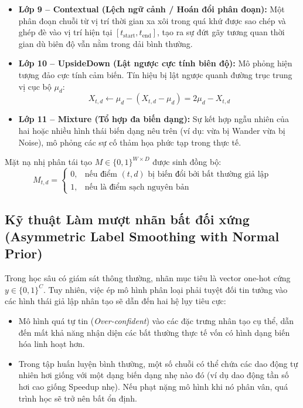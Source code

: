 \documentclass[11pt,journal,onecolumn]{IEEEtran}
\begin{document}
\begin{itemize}
    \item \textbf{Lớp 9 -- Contextual (Lệch ngữ cảnh / Hoán đổi phân đoạn):} Một phân đoạn chuỗi từ vị trí thời gian xa xôi trong quá khứ được sao chép và ghép đè vào vị trí hiện tại $[t_{\text{start}}, t_{\text{end}}]$, tạo ra sự đứt gãy tương quan thời gian dù biên độ vẫn nằm trong dải bình thường.
    
    \item \textbf{Lớp 10 -- UpsideDown (Lật ngược cực tính biên độ):} Mô phỏng hiện tượng đảo cực tính cảm biến. Tín hiệu bị lật ngược quanh đường trục trung vị cục bộ $\mu_d$:
    \begin{equation}
    X_{t, d} \leftarrow \mu_d - (X_{t, d} - \mu_d) = 2\mu_d - X_{t, d}
    \end{equation}
    
    \item \textbf{Lớp 11 -- Mixture (Tổ hợp đa biến dạng):} Sự kết hợp ngẫu nhiên của hai hoặc nhiều hình thái biến dạng nêu trên (ví dụ: vừa bị Wander vừa bị Noise), mô phỏng các sự cố thảm họa phức tạp trong thực tế.
\end{itemize}

Mặt nạ nhị phân tái tạo $M \in \{0, 1\}^{W \times D}$ được sinh đồng bộ:
\begin{equation}
\label{eq:binary_mask}
M_{t, d} = 
\begin{cases}
0, & \text{nếu điểm } (t, d) \text{ bị biến đổi bởi bất thường giả lập} \\
1, & \text{nếu là điểm sạch nguyên bản}
\end{cases}
\end{equation}

\subsection{Kỹ thuật Làm mượt nhãn bất đối xứng (Asymmetric Label Smoothing with Normal Prior)}
\label{subsec:label_smoothing}
Trong học sâu có giám sát thông thường, nhãn mục tiêu là vector one-hot cứng $y \in \{0, 1\}^C$. Tuy nhiên, việc ép mô hình phân loại phải tuyệt đối tin tưởng vào các hình thái giả lập nhân tạo sẽ dẫn đến hai hệ lụy tiêu cực:
\begin{itemize}
    \item Mô hình quá tự tin (\textit{Over-confident}) vào các đặc trưng nhân tạo cụ thể, dẫn đến mất khả năng nhận diện các bất thường thực tế vốn có hình dạng biến hóa linh hoạt hơn.
    \item Trong tập huấn luyện bình thường, một số chuỗi có thể chứa các dao động tự nhiên hơi giống với một dạng biến dạng nhẹ nào đó (ví dụ dao động tần số hơi cao giống Speedup nhẹ). Nếu phạt nặng mô hình khi nó phân vân, quá trình học sẽ trở nên bất ổn định.
\end{itemize}
\end{document}
